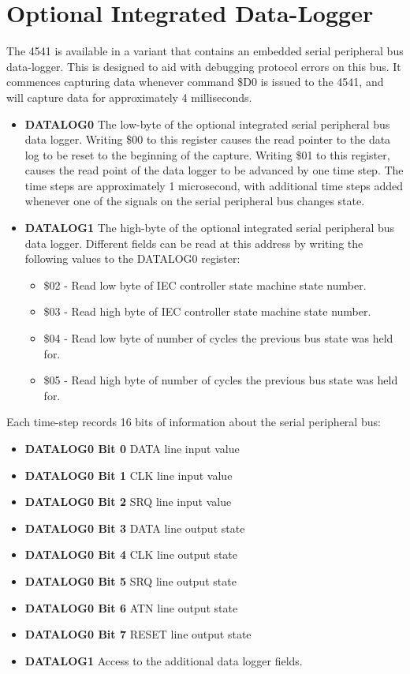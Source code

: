 \section{Optional Integrated Data-Logger}

The 4541 is available in a variant that contains an embedded serial
peripheral bus data-logger. This is designed to aid with debugging
protocol errors on this bus. It commences capturing data whenever
command \$D0 is issued to the 4541, and
will capture data for approximately 4 milliseconds.

\begin{itemize}
  \item {\bf DATALOG0} The low-byte of the optional integrated serial
    peripheral bus data logger.  Writing \$00 to this register causes
    the read pointer to the data log to be reset to the beginning of
    the capture. Writing \$01 to this register, causes the
    read point of the data logger to be advanced by one time step.
    The time steps are approximately 1 microsecond, with additional
    time steps added whenever one of the signals on the serial
    peripheral bus changes state.
    \item {\bf DATALOG1} The high-byte of the optional integrated serial
      peripheral bus data logger. Different fields can be read at this
      address by writing the following values to the DATALOG0
      register:
      \begin{itemize}
        \item \$02 - Read low byte of IEC controller state machine
          state number.
        \item \$03 - Read high byte of IEC controller state machine
          state number.
        \item \$04 - Read low byte of number of cycles the previous bus state
          was held for.
        \item \$05 - Read high byte of number of cycles the previous bus state
          was held for.
        \end{itemize}
\end{itemize}

Each time-step records 16 bits of information about the serial
peripheral bus:
\begin{itemize}
\item {\bf DATALOG0 Bit 0} DATA line input value
\item {\bf DATALOG0 Bit 1} CLK line input value
\item {\bf DATALOG0 Bit 2} SRQ line input value
\item {\bf DATALOG0 Bit 3} DATA line output state
\item {\bf DATALOG0 Bit 4} CLK line output state
\item {\bf DATALOG0 Bit 5} SRQ line output state
\item {\bf DATALOG0 Bit 6} ATN line output state
\item {\bf DATALOG0 Bit 7} RESET line output state
\item {\bf DATALOG1} Access to the additional data logger fields.
\end{itemize}

